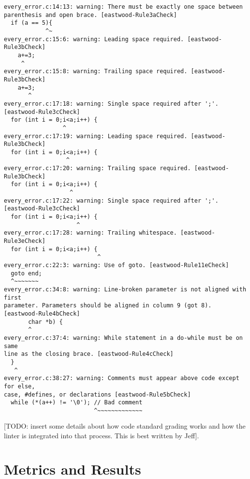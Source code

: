 \documentclass[sigconf]{acmart}
\begin{document}
\begin{lstlisting}[basicstyle=\tiny,caption={Example of \textit{Eastwood} output, formatted for width}, captionpos=b]
every_error.c:14:13: warning: There must be exactly one space between
parenthesis and open brace. [eastwood-Rule3aCheck]
  if (a == 5){
            ^~
every_error.c:15:6: warning: Leading space required. [eastwood-Rule3bCheck]
    a+=3;
     ^
every_error.c:15:8: warning: Trailing space required. [eastwood-Rule3bCheck]
    a+=3;
       ^
every_error.c:17:18: warning: Single space required after ';'. [eastwood-Rule3cCheck]
  for (int i = 0;i<a;i++) { 
                 ^
every_error.c:17:19: warning: Leading space required. [eastwood-Rule3bCheck]
  for (int i = 0;i<a;i++) { 
                  ^
every_error.c:17:20: warning: Trailing space required. [eastwood-Rule3bCheck]
  for (int i = 0;i<a;i++) { 
                   ^
every_error.c:17:22: warning: Single space required after ';'. [eastwood-Rule3cCheck]
  for (int i = 0;i<a;i++) { 
                     ^
every_error.c:17:28: warning: Trailing whitespace. [eastwood-Rule3eCheck]
  for (int i = 0;i<a;i++) { 
                           ^
every_error.c:22:3: warning: Use of goto. [eastwood-Rule11eCheck]
  goto end;
  ^~~~~~~~
every_error.c:34:8: warning: Line-broken parameter is not aligned with first
parameter. Parameters should be aligned in column 9 (got 8). [eastwood-Rule4bCheck]
       char *b) {
       ^
every_error.c:37:4: warning: While statement in a do-while must be on same
line as the closing brace. [eastwood-Rule4cCheck]
  }
   ^
every_error.c:38:27: warning: Comments must appear above code except for else,
case, #defines, or declarations [eastwood-Rule5bCheck]
  while (*(a++) != '\0'); // Bad comment
                          ^~~~~~~~~~~~~~
\end{lstlisting}


[TODO: insert some details about how code standard grading works and how the linter is integrated into that process. This is best written by Jeff].

\section{Metrics and Results}
\end{document}

